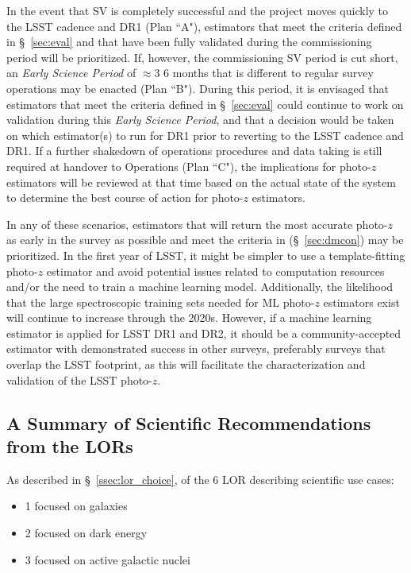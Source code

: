 \documentclass[DM,authoryear,toc]{lsstdoc}
\begin{document}
In the event that SV is completely successful and the project moves quickly to the LSST cadence and DR1 (Plan ``A"), estimators that  meet the criteria defined in \S~\ref{sec:eval} and that have been fully validated during the commissioning period will be prioritized. 
If, however, the commissioning SV period is cut short, an {\it Early Science Period} of $\approx$3\,\textendash\,6 months that is different to regular survey operations may be enacted (Plan ``B").
During this period, it is envisaged that estimators that meet the criteria defined in \S~\ref{sec:eval} could continue to work on validation during this {\it Early Science Period}, and that a decision would be taken on which estimator(s) to run for DR1 prior to reverting to the LSST cadence and DR1. 
If a further shakedown of operations procedures and data taking is still required at handover to Operations (Plan ``C"), the implications for photo-$z$ estimators will be reviewed at that time based on the actual state of the system to determine the best course of action for photo-$z$ estimators. 

In any of these scenarios, estimators that will return the most accurate photo-$z$ as early in the survey as possible and meet the criteria in (\S~\ref{sec:dmcon}) may be prioritized.
In the first year of LSST, it might be simpler to use a template-fitting photo-$z$ estimator and avoid potential issues related to computation resources and/or the need to train a machine learning model.
Additionally, the likelihood that the large spectroscopic training sets needed for ML photo-$z$ estimators exist will continue to increase through the 2020s.
However, if a machine learning estimator is applied for LSST DR1 and DR2, it should be a community-accepted estimator with demonstrated success in other surveys, preferably surveys that overlap the LSST footprint, as this will facilitate the characterization and validation of the LSST photo-$z$.

\subsection{A Summary of Scientific Recommendations from the LORs}\label{ssec:use_scilor}

As described in \S~\ref{ssec:lor_choice}, of the 6 LOR describing scientific use cases:
\begin{itemize}
\item 1 focused on galaxies
\item 2 focused on dark energy
\item 3 focused on active galactic nuclei
\end{itemize}
\end{document}
